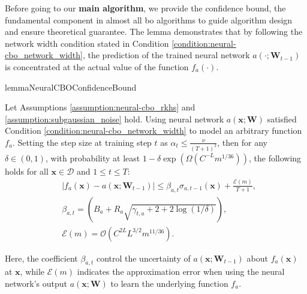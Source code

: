 Before going to our \textbf{main algorithm}, we provide the confidence bound, the fundamental component in almost all \ac{bo} algorithms to guide algorithm design and ensure theoretical guarantee. The lemma demonstrates that by following the network width condition stated in Condition \ref{condition:neural-cbo_network_width},  the prediction of the trained neural network $a(\cdot;\mathbf{W}_{t-1})$ is concentrated at the actual value of the function $f_a(\cdot)$. 
\begin{restatable}{lemma}{NeuralCBOConfidenceBound}

\label{lemma:neural-cbo_confidence_bound}
Let Assumptions \ref{assumption:neural-cbo_rkhs} and \ref{assumption:subgaussian_noise} hold. Using neural network $a(\mathbf{x}; \mathbf{W})$ satisfied Condition \ref{condition:neural-cbo_network_width} to model an arbitrary function $f_a$. Setting the step size at training step $t$ as $\alpha_t \le \frac{\nu}{(T+1)^2}$, then for any $\delta \in (0,1)$,  with probability at least $1 - \delta \exp (\Omega(C^{-L} m^{1/36}))$, the following holds for all $\mathbf{x} \in \mathcal{D}$ and $1 \le t \le T$:
\begin{align*}
     & \lvert f_a(\mathbf{x}) - a(\mathbf{x}; \mathbf{W}_{t-1}) \rvert 
    \le \beta_{a,t} \sigma_{a, t-1}(\mathbf{x}) + \frac{\mathcal{E}(m)}{T+1},
    \\
    & \beta_{a,t} = \left(B_a + R_a \sqrt{\gamma_{t,a} + 2 + 2 \log(1/\delta)}\right),
    \\
    & \mathcal{E}(m) = \mathcal{O}(C^{2L} L^{3/2} m^{11/36}).
\end{align*}
\end{restatable}
Here, the coefficient $\beta_{a,t}$ control the uncertainty of $a(\mathbf{x}; \mathbf{W}_{t-1})$ about $f_a(\mathbf{x})$ at $\mathbf{x}$, while $ \mathcal{E}(m)$ indicates the approximation error when using the neural network's output $a(\mathbf{x}; \boldsymbol{W})$ to learn the underlying function $f_a$.     

